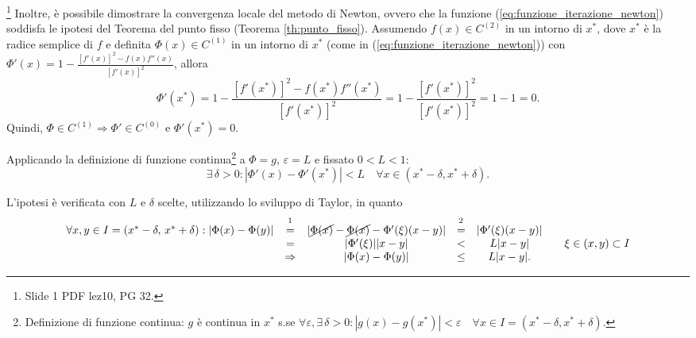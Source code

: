 \addtocounter{footnote}{-4}





\noindent\footnote{Slide 1 PDF lez10, PG 32.} Inoltre, è possibile dimostrare la convergenza locale del metodo di Newton, ovvero che la funzione (\ref{eq:funzione_iterazione_newton}) soddisfa le ipotesi del Teorema del punto fisso (Teorema \ref{th:punto_fisso}). Assumendo $f(x)\in C^{(2)}$ in un intorno di $x^*$, dove $x^*$ è la radice semplice di $f$ e definita $\Phi(x)\in C^{(1)}$ in un intorno di $x^*$ (come in (\ref{eq:funzione_iterazione_newton})) con $\Phi'(x)=1-\frac{[f'(x)]^2-f(x)f''(x)}{[f'(x)]^2}$, allora
\begin{equation*}
	\Phi'(x^*)=1-\frac{[f'(x^*)]^2-f(x^*)f''(x^*)}{[f'(x^*)]^2}=1-\frac{[f'(x^*)]^2}{[f'(x^*)]^2}=1-1=0.
\end{equation*}
Quindi, $\Phi\in C^{(1)}\Rightarrow\Phi'\in C^{(0)}$ e $\Phi'(x^*)=0$.

Applicando la definizione di funzione continua\footnote{Definizione di funzione continua: $g$ è continua in $x^*$ s.se $\forall\varepsilon, \exists\,\delta>0:|g(x)-g(x^*)|<\varepsilon\quad\forall x\in I=(x^*-\delta,x^*+\delta)$.} a $\Phi=g$, $\varepsilon =L$ e fissato $0<L<1$:
\begin{equation*}
	\exists\,\delta>0:|\Phi'(x)-\Phi'(x^*)|<L \quad\forall x\in (x^*-\delta,x^*+\delta).
\end{equation*}


L'ipotesi è verificata con $L$ e $\delta$ scelte, utilizzando lo sviluppo di Taylor, in quanto
\begin{equation*}
	\begin{matrix}
		\forall x,y \in I=(x^*-\delta,\, x^*+\delta): |\Phi(x)-\Phi(y)| &\overset{\footnotemark}{=}& |\cancel{\Phi(x)}-\cancel{\Phi(x)}-\Phi'(\xi)(x-y)|  &\overset{\footnotemark}{=}& |\Phi'(\xi)(x-y)| \\
		&=& |\Phi'(\xi)||x-y| &<& L|x-y| && \xi\in(x,y)\subset I\\
		&\Rightarrow&|\Phi(x)-\Phi(y)|&\leq& L|x-y|.
	\end{matrix}
\end{equation*}

